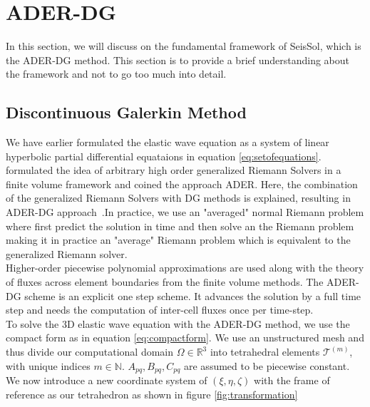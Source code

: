 \section{\ac{ADER}-\ac{DG}}\label{section:ADER-DG}

In this section, we will discuss on the fundamental framework of SeisSol, which is the \ac{ADER}-\ac{DG} method. This section is to provide
a brief understanding about the framework and not to go too much into detail. 


\subsection[Discontinuous Galerkin method]{Discontinuous Galerkin Method}\label{subsection:DG}

We have earlier formulated the elastic wave equation as a system of linear hyperbolic partial differential equataions in equation \ref{eq:setofequations}.
~\parencite{Toro2001} formulated the idea of arbitrary high order generalized
Riemann Solvers in a finite volume framework and coined the approach \ac{ADER}. Here, the combination of the generalized Riemann Solvers with \ac{DG}
methods is explained, resulting in \ac{ADER}-\ac{DG} approach~\parencite{Dumbser2006}.In practice, we use an "averaged" normal Riemann problem where first predict
the solution in time and then solve an the Riemann problem making it in practice an "average" Riemann problem which is equivalent to the generalized Riemann solver. \\
 Higher-order piecewise polynomial approximations are used
along with the theory of fluxes across element boundaries from the finite volume methods. The \ac{ADER}-\ac{DG} scheme is an explicit one step scheme.
It advances the solution by a full time step and needs the computation of inter-cell fluxes once per time-step. \\

To solve the 3D elastic wave equation with the \ac{ADER}-\ac{DG} method, we use the compact form as in equation \ref{eq:compactform}.
We use an unstructured mesh and thus divide our computational domain $\Omega \in \mathbb{R}^3$ into tetrahedral elements 
$\mathcal{T}^{\left(m\right)}$, with unique indices $m\in\mathbb{N}$. $A_{pq}, B_{pq}, C_{pq}$ are assumed to be piecewise constant. 
We now introduce a new coordinate system of $\left(\xi, \eta, \zeta \right)$ with the frame of reference as our tetrahedron as shown 
in figure \ref{fig:transformation} \\

